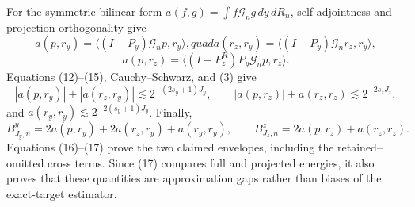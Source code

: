 For the symmetric bilinear form \(a(f,g)=\int f\mathcal G_ng\,dy\,dR_n\), self-adjointness and projection orthogonality give
\[
a(p,r_y)=\langle(I-P_y)\mathcal G_np,r_y\rangle,quad
a(r_z,r_y)=\langle(I-P_y)\mathcal G_nr_z,r_y\rangle,
\]
\[
a(p,r_z)=\langle(I-P_z^R)P_y\mathcal G_np,r_z\rangle. \tag{15}
\]
Equations (12)--(15), Cauchy--Schwarz, and (3) give
\[
|a(p,r_y)|+|a(r_z,r_y)|\lesssim2^{-(2s_y+1)J_y},
\qquad |a(p,r_z)|+a(r_z,r_z)\lesssim2^{-2s_zJ_z}, \tag{16}
\]
and \(a(r_y,r_y)\lesssim2^{-2(s_y+1)J_y}\).  Finally,
\[
B^y_{J_y,n}=2a(p,r_y)+2a(r_z,r_y)+a(r_y,r_y),
\qquad
B^z_{J_z,n}=2a(p,r_z)+a(r_z,r_z). \tag{17}
\]
Equations (16)--(17) prove the two claimed envelopes, including the retained--omitted cross terms.  Since (17) compares full and projected energies, it also proves that these quantities are approximation gaps rather than biases of the exact-target estimator.